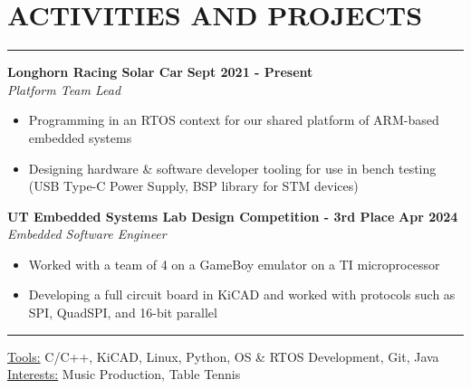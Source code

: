 \documentclass{article}
\newcommand{\sectionHeader}[1]{%
    \vspace{-1.5\baselineskip}
    \section*{\MakeUppercase{\large #1}} %
    \vspace{-1.75\baselineskip} %
    \color{teal}
    \rule{\textwidth}{2pt} %
    \color{black}
    \vspace{-1.5\baselineskip}
}
\newcommand{\role}[3]{
    \textit{#1} \hfill \textit{#2} \\[0pt]
    #3
}
\newcommand{\sectionItem}[5]{ %
    \textbf{#1} \hfill \textbf{#2} \\[0pt]
    \role{#3}{#4}{#5}    %
    \vspace{10pt}
}
\begin{document}
\sectionHeader{activities and projects}
\begin{flushleft}
    \sectionItem{Longhorn Racing Solar Car}{Sept 2021 - Present}{Platform Team Lead}{}{
        \begin{itemize}
            \item[\textbullet] Programming in an RTOS context for our shared platform of ARM-based embedded systems
            \item[\textbullet] Designing hardware \& software developer tooling for use in bench testing (USB Type-C Power Supply, BSP library for STM devices)
        \end{itemize}
    }
    \sectionItem{UT Embedded Systems Lab Design Competition - 3rd Place}{Apr 2024}{Embedded Software Engineer}{}{
        \begin{itemize}
            \item[\textbullet] Worked with a team of 4 on a GameBoy emulator on a TI microprocessor
            \item[\textbullet] Developing a full circuit board in KiCAD and worked with protocols such as SPI, QuadSPI, and 16-bit parallel
        \end{itemize}
    }
\end{flushleft}


\begin{flushleft}
    \rule{\textwidth}{1pt}
    \underline{Tools:} C/C++, KiCAD, Linux, Python, OS \& RTOS Development, Git, Java \\
    \underline{Interests:} Music Production, Table Tennis
\end{flushleft}
\end{document}
